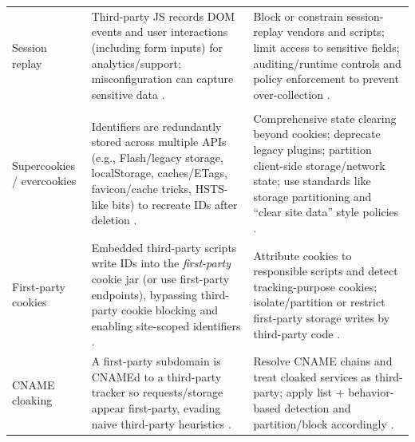 \begin{table}[t]
\begin{tabularx}{\textwidth}{p{2.8cm} Y Y}
Session replay &
Third-party JS records DOM events and user interactions (including form inputs) for analytics/support; misconfiguration can capture sensitive data \cite{englehardtNoBoundariesCredentials2018}. &
Block or constrain session-replay vendors and scripts; limit access to sensitive fields; auditing/runtime controls and policy enforcement to prevent over-collection \cite{englehardtNoBoundariesCredentials2018}. \\

\addlinespace[3pt]
\\
\addlinespace[2pt]

Supercookies / evercookies &
Identifiers are redundantly stored across multiple APIs (e.g., Flash/legacy storage, localStorage, caches/ETags, favicon/cache tricks, HSTS-like bits) to recreate IDs after deletion \cite{kamkarSamyKamkarEvercookie2010,ayensonFlashCookiesPrivacy2011,fouadMyCookiePhoenix2022,solomosTalesFaviconsCaches2021,mishraDejaVuAbusing2021,syversonHSTSSupportsTargeted2018}. &
Comprehensive state clearing beyond cookies; deprecate legacy plugins; partition client-side storage/network state; use standards like storage partitioning and “clear site data” style policies \cite{privacycommunitygroupClientSideStoragePartitioning2022,TrackingPreventionWebKit2020}. \\

First-party cookies &
Embedded third-party scripts write IDs into the \emph{first-party} cookie jar (or use first-party endpoints), bypassing third-party cookie blocking and enabling site-scoped identifiers \cite{chenCookieSwapParty2021,demirUnderstandingFirstPartyCookie2022}. &
Attribute cookies to responsible scripts and detect tracking-purpose cookies; isolate/partition or restrict first-party storage writes by third-party code \cite{munirCookieGraphUnderstandingDetecting2023,bahramiCOOKIEGUARDCharacterizingIsolating2024}. \\

CNAME cloaking &
A first-party subdomain is CNAMEd to a third-party tracker so requests/storage appear first-party, evading naive third-party heuristics \cite{daoCNAMECloakingBasedTracking2021,dimovaCNAMEGameLargescale2021}. &
Resolve CNAME chains and treat cloaked services as third-party; apply list + behavior-based detection and partition/block accordingly \cite{daoCNAMECloakingBasedTracking2021,dimovaCNAMEGameLargescale2021}. \\


\end{tabularx}
\end{table}
